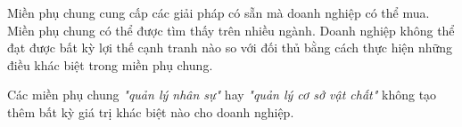 Miền phụ chung cung cấp các giải pháp có sẵn mà doanh nghiệp có thể mua.  Miền phụ chung có thể được tìm thấy trên nhiều ngành.   Doanh nghiệp không thể đạt được bất kỳ lợi thế cạnh tranh nào so với đối thủ bằng cách thực hiện những điều khác biệt trong miền phụ chung.

\begin{example} Các miền phụ chung \textit{"quản lý nhân sự"} hay \textit{"quản lý cơ sở vật chất"} không tạo thêm bất kỳ giá trị khác biệt nào cho doanh nghiệp.

\end{example} 